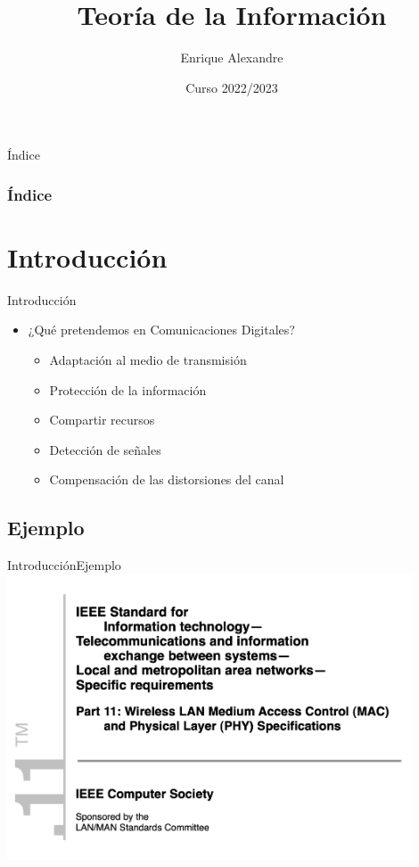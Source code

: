 \documentclass[10pt,compress]{beamer} %
\title[Teoría de la Información]{Teoría de la Información}
\author{Enrique Alexandre}
\institute{Dpto. de Teoría de la Señal y Comunicaciones}
\date{Curso 2022/2023}
\begin{document}
{\titlepageBlue
    \begin{frame}
        \titlepage
    \end{frame}
}

{
\begin{frame}[shrink]{Índice}
 \frametitle{Índice}
 \tableofcontents
\end{frame}
}

\section{Introducción}

\begin{frame}{Introducción}
  \begin{itemize}
    \item ¿Qué pretendemos en Comunicaciones Digitales?
    \begin{itemize}
      \item Adaptación al medio de transmisión
      \item Protección de la información
      \item Compartir recursos
      \item Detección de señales
      \item Compensación de las distorsiones del canal
    \end{itemize}
\end{itemize}
\end{frame}

\subsection{Ejemplo}
\begin{frame}{Introducción}{Ejemplo}
  \centering \includegraphics[width=0.9\textwidth]{./Figuras/Wifi1.pdf}
\end{frame}
\end{document}
